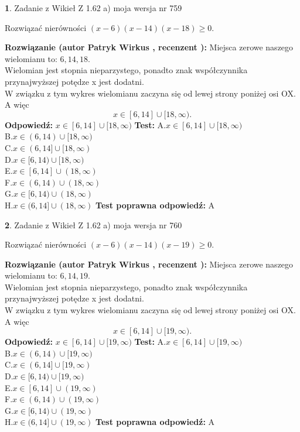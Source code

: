 \documentclass[12pt, a4paper]{article}
\theoremstyle{definition} %
\newtheorem{zad}{}
\newcommand{\zadStart}[1]{\begin{zad}#1\newline}
\newcommand{\zadStop}{\end{zad}}
\newcommand{\rozwStart}[2]{\noindent \textbf{Rozwiązanie (autor #1 , recenzent #2): }\newline}
\newcommand{\rozwStop}{\newline}
\newcommand{\odpStart}{\noindent \textbf{Odpowiedź:}\newline}
\newcommand{\odpStop}{\newline}
\newcommand{\testStart}{\noindent \textbf{Test:}\newline}
\newcommand{\testStop}{\newline}
\newcommand{\kluczStart}{\noindent \textbf{Test poprawna odpowiedź:}\newline}
\newcommand{\kluczStop}{\newline}
\begin{document}
\zadStart{Zadanie z Wikieł Z 1.62 a) moja wersja nr 759}

Rozwiązać nierówności $(x-6)(x-14)(x-18)\ge0$.
\zadStop
\rozwStart{Patryk Wirkus}{}
Miejsca zerowe naszego wielomianu to: $6, 14, 18$.\\
Wielomian jest stopnia nieparzystego, ponadto znak współczynnika przy\linebreak najwyższej potędze x jest dodatni.\\ W związku z tym wykres wielomianu zaczyna się od lewej strony poniżej osi OX. A więc $$x \in [6,14] \cup [18,\infty).$$
\rozwStop
\odpStart
$x \in [6,14] \cup [18,\infty)$
\odpStop
\testStart
A.$x \in [6,14] \cup [18,\infty)$\\
B.$x \in (6,14) \cup [18,\infty)$\\
C.$x \in (6,14] \cup [18,\infty)$\\
D.$x \in [6,14) \cup [18,\infty)$\\
E.$x \in [6,14] \cup (18,\infty)$\\
F.$x \in (6,14) \cup (18,\infty)$\\
G.$x \in [6,14) \cup (18,\infty)$\\
H.$x \in (6,14] \cup (18,\infty)$
\testStop
\kluczStart
A
\kluczStop



\zadStart{Zadanie z Wikieł Z 1.62 a) moja wersja nr 760}

Rozwiązać nierówności $(x-6)(x-14)(x-19)\ge0$.
\zadStop
\rozwStart{Patryk Wirkus}{}
Miejsca zerowe naszego wielomianu to: $6, 14, 19$.\\
Wielomian jest stopnia nieparzystego, ponadto znak współczynnika przy\linebreak najwyższej potędze x jest dodatni.\\ W związku z tym wykres wielomianu zaczyna się od lewej strony poniżej osi OX. A więc $$x \in [6,14] \cup [19,\infty).$$
\rozwStop
\odpStart
$x \in [6,14] \cup [19,\infty)$
\odpStop
\testStart
A.$x \in [6,14] \cup [19,\infty)$\\
B.$x \in (6,14) \cup [19,\infty)$\\
C.$x \in (6,14] \cup [19,\infty)$\\
D.$x \in [6,14) \cup [19,\infty)$\\
E.$x \in [6,14] \cup (19,\infty)$\\
F.$x \in (6,14) \cup (19,\infty)$\\
G.$x \in [6,14) \cup (19,\infty)$\\
H.$x \in (6,14] \cup (19,\infty)$
\testStop
\kluczStart
A
\kluczStop
\end{document}
